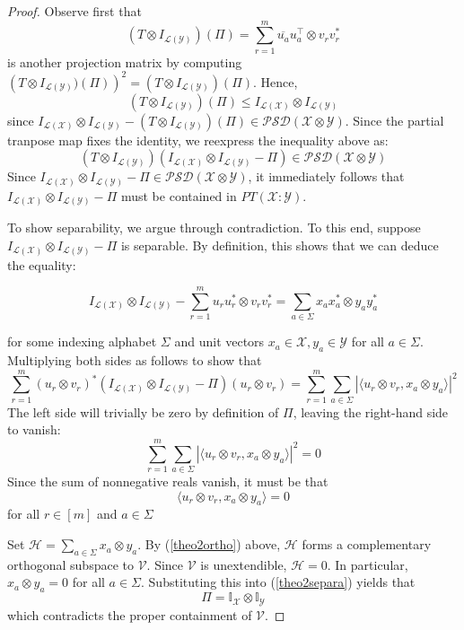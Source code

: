 \documentclass[12pt]{article}
\newcommand{\X}{\mathcal{X}}
\newcommand{\Y}{\mathcal{Y}}
\newcommand{\LX}{\mathcal{L}(\mathcal{X})}
\newcommand{\LY}{\mathcal{L}(\mathcal{Y})}
\begin{document}
\begin{proof}
  Observe first that
  \[ (T \otimes I_{\LY})(\Pi) = \sum_{r = 1}^m \overline{u_a}u_a^\intercal \otimes v_rv_r^* \]
  is another projection matrix by computing $\left( T \otimes I_{\LY})(\Pi) \right)^2 = (T \otimes I_{\LY})(\Pi)$. Hence, $$(T \otimes I_{\LY})(\Pi) \leq I_{\LX} \otimes I_{\LY}$$ since $I_{\LX} \otimes I_{\LY} - (T \otimes I_{\LY})(\Pi) \in \mathcal{PSD}(\X \otimes \Y)$. Since the partial tranpose map fixes the identity, we reexpress the inequality above as:
  \begin{equation}
    (T \otimes I_{\LY})(I_{\LX} \otimes I_{\LY} - \Pi) \in \mathcal{PSD}(\X \otimes \Y)
  \end{equation}
  Since $I_{\LX} \otimes I_{\LY} - \Pi \in \mathcal{PSD}(\X \otimes \Y)$, it immediately follows that $I_{\LX} \otimes I_{\LY} - \Pi$ must be contained in $PT(\X : \Y)$.

  To show separability, we argue through contradiction. To this end, suppose $I_{\LX} \otimes I_{\LY} - \Pi$ is separable. By definition, this shows that we can deduce the equality:

  \begin{equation} \label{theo2separa}
  I_{\LX} \otimes I_{\LY} - \sum_{r=1}^m u_ru_r^* \otimes v_rv_r^* = \sum_{a \in \Sigma} x_ax_a^* \otimes y_ay_a^*
  \end{equation}

  for some indexing alphabet $\Sigma$ and unit vectors $x_a \in \X, y_a \in \Y$ for all $a\in\Sigma$.
  Multiplying both sides as follows to show that
  \[
  \sum_{r=1}^m (u_r \otimes v_r)^* (I_{\LX} \otimes I_{\LY} - \Pi)(u_r \otimes v_r) = \sum_{r=1}^m\sum_{a\in\Sigma} |\langle u_r \otimes v_r, x_a \otimes y_a \rangle|^2
  \]
  The left side will trivially be zero by definition of $\Pi$, leaving the right-hand side to vanish:
  \[
   \sum_{r=1}^m\sum_{a\in\Sigma} |\langle u_r \otimes v_r, x_a \otimes y_a \rangle|^2 = 0
  \]
  Since the sum of nonnegative reals vanish, it must be that
  \begin{equation} \label{theo2ortho}
     \langle u_r \otimes v_r, x_a \otimes y_a \rangle = 0
  \end{equation}
  for all $r \in [m]$ and $a \in \Sigma$

  Set $\mathcal{H} = \sum_{a \in \Sigma} x_a \otimes y_a$. By (\ref{theo2ortho}) above, $\mathcal{H}$ forms a complementary orthogonal subspace to $\mathcal{V}$. Since $\mathcal{V}$ is unextendible, $\mathcal{H} = 0$. In particular, $x_a \otimes y_a = 0$ for all $a \in \Sigma$. Substituting this into (\ref{theo2separa}) yields that
  $$ \Pi = \mathbb{I}_\X \otimes \mathbb{I}_\Y $$ which contradicts the proper containment of $\mathcal{V}$.
\end{proof}
\end{document}
